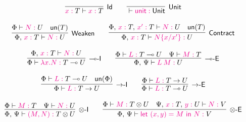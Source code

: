 \begin{figure*}
\[\colored
\begin{array}{c}

\inference{}{Id}{
  \Tp{\Tmof{x}T} \Tpvdash \Tmof{x}\Tp{T}
}

\quad\quad

\inference{}{Unit}{
  \Tpvdash \Tmof{\key{unit}}\Tp{\key{Unit}}
}

\\~\\

\inference{
  \Tp{\Phi} \Tpvdash \Tmof{N}\Tp{U}  &  \un(\Tp{T})
}{Weaken}{
  \Tp{\Phi \comma \Tmof{x}T} \Tpvdash \Tmof{N}\Tp{U}
}

\quad\quad

\inference{
  \Tp{\Phi \comma \Tmof{x}T \comma \Tmof{x'}T} \Tpvdash \Tmof{N}\Tp{U}  &  \un(\Tp{T})
}{Contract}{
  \Tp{\Phi \comma \Tmof{x}T} \Tpvdash \Tmof{N\sub{x/x'}}\Tp{U}
}

\\~\\

\inference{
  \Tp{\Phi \comma \Tmof{x}T} \Tpvdash \Tmof{N}\Tp{U}
}{{\lolli}\intro}{
  \Tp{\Phi} \Tpvdash \Tmof{\lam{x}N}\Tp{T \lolli U}
}

\quad\quad

\inference{
  \Tp{\Phi} \Tpvdash \Tmof{L} \Tp{T \lolli U} &
  \Tp{\Psi} \Tpvdash \Tmof{M} \Tp{T}
}{{\lolli}\elim}{
  \Tp{\Phi \comma \Psi} \Tpvdash \Tmof{L \app M} \Tp{U}
}

\\~\\

\inference{
  \Tp{\Phi} \Tpvdash \Tmof{L} \Tp{T \lolli U} & \un(\Tp{\Phi})
}{{\to}\intro}{
  \Tp{\Phi} \Tpvdash \Tmof{L} \Tp{T \to U}
}

\quad\quad

\inference{
  \Tp{\Phi} \Tpvdash \Tmof{L} \Tp{T \to U}
}{{\to}\elim}{
  \Tp{\Phi} \Tpvdash \Tmof{L} \Tp{T \lolli U}
}

\\~\\

\inference{
  \Tp{\Phi} \Tpvdash \Tmof{M} \Tp{T} &
  \Tp{\Psi} \Tpvdash \Tmof{N} \Tp{U}
}{\otimes\intro}{
  \Tp{\Phi \comma \Psi} \Tpvdash \Tmof{(M,N)} \Tp{T \otimes U}
}

\quad\quad

\inference{
  \Tp{\Phi} \Tpvdash \Tmof{M} \Tp{T \otimes U} &
  \Tp{\Psi \comma \Tmof{x}T \comma \Tmof{y}U} \Tpvdash \Tmof{N} \Tp{V}
}{\otimes\elim}{
  \Tp{\Phi \comma \Psi} \Tpvdash \Tmof{\key{let}~(x,y) = M~\key{in}~N} \Tp{V}
}


\end{array}\]
\end{figure*}
